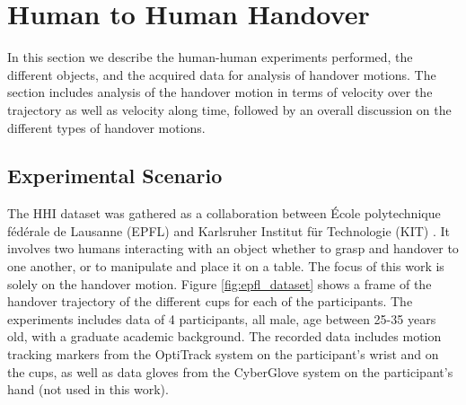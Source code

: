 \section{Human to Human Handover}
\label{sec:human}

In this section we describe the human-human experiments performed, the different objects, and the acquired data for analysis of handover motions. The section includes analysis of the handover motion in terms of velocity over the trajectory as well as velocity along time, followed by an overall discussion on the different types of handover motions. 

\subsection{Experimental Scenario}

The HHI dataset was gathered as a collaboration between 
École polytechnique fédérale de Lausanne (EPFL) and Karlsruher Institut für Technologie (KIT) \cite{starke_force_2019}. It involves two humans interacting with an object whether to grasp and handover to one another, or to manipulate and place it on a table. The focus of this work is solely on the handover motion. Figure \ref{fig:epfl_dataset} shows a frame of the handover trajectory of the different cups for each of the participants. The experiments includes data of 4 participants, all male, age between 25-35 years old, with a graduate academic background. The recorded data includes motion tracking markers from the OptiTrack system on the participant's wrist and on the cups, as well as data gloves from the CyberGlove system on the participant's hand (not used in this work).

